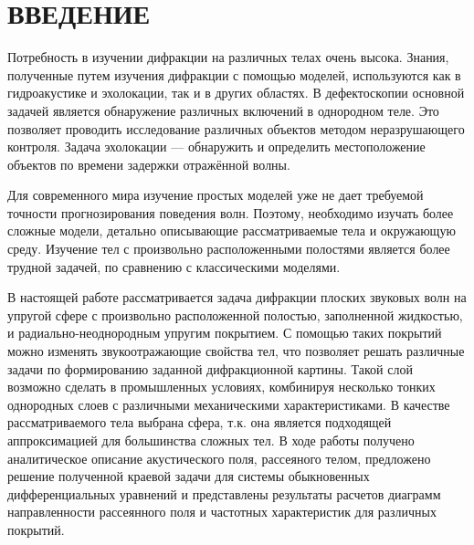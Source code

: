 

\renewcommand{\bibname}{СПИСОК ИСПОЛЬЗОВАННЫХ ИСТОЧНИКОВ}
\renewcommand\refname{СПИСОК ИСПОЛЬЗОВАННЫХ ИСТОЧНИКОВ}

%

\setcounter{page}{2}
\thispagestyle {empty}
\renewcommand{\contentsname}{\centering СОДЕРЖАНИЕ}
\tableofcontents

\newpage
\section*{ВВЕДЕНИЕ}


Потребность в изучении дифракции на различных телах очень высока. Знания, полученные путем изучения дифракции с помощью моделей, используются как в гидроакустике и эхолокации, так и в других областях. В дефектоскопии основной задачей является обнаружение различных включений в однородном теле. Это позволяет проводить исследование различных объектов методом неразрушающего контроля. Задача эхолокации --- обнаружить и определить местоположение объектов  по времени задержки отражённой волны.

Для современного мира изучение простых моделей уже не дает требуемой точности прогнозирования поведения волн. Поэтому, необходимо изучать более сложные модели, детально описывающие рассматриваемые тела и окружающую среду. Изучение тел с произвольно расположенными полостями является более трудной задачей, по сравнению с классическими моделями. 

В настоящей работе рассматривается задача дифракции плоских звуковых волн на упругой сфере с произвольно расположенной полостью, заполненной жидкостью, и радиально-неоднородным упругим покрытием. С помощью таких покрытий можно изменять звукоотражающие свойства тел, что позволяет решать различные задачи по формированию заданной дифракционной картины. Такой слой возможно сделать в промышленных условиях, комбинируя несколько тонких однородных слоев с различными механическими характеристиками. В качестве рассматриваемого тела выбрана сфера, т.к. она является подходящей аппроксимацией для большинства сложных тел. В ходе работы получено аналитическое описание акустического поля, рассеяного телом, предложено решение полученной краевой задачи для системы обыкновенных дифференциальных уравнений и представлены результаты расчетов диаграмм направленности рассеянного поля и частотных характеристик для различных покрытий.


\newpage
